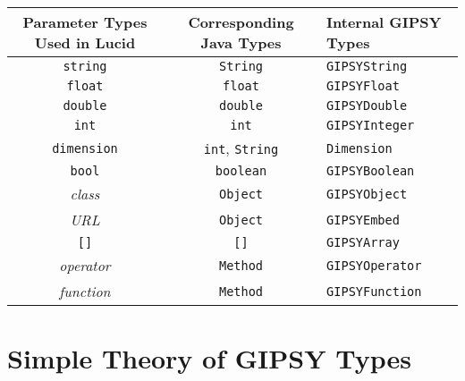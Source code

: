 \documentclass{easychair}
\newcommand{\api}[1]{\texttt{#1}\index{API!#1}}
\begin{document}
\begin{table}
\begin{minipage}[b]{\textwidth}
\begin{center}
\begin{tabular}{|c|c|l|}
{\scriptsize Parameter Types Used in Lucid} & {\scriptsize Corresponding Java Types}   & {\scriptsize Internal GIPSY Types} \\ \hline\hline
\api{string}                                & \api{String}                             & \api{GIPSYString}\\
\api{float}                                 & \api{float}                              & \api{GIPSYFloat}\\
\api{double}                                & \api{double}                             & \api{GIPSYDouble}\\
\api{int}                                   & \api{int}                                & \api{GIPSYInteger} \\
\api{dimension}                             & \api{int}, \api{String}                  & \api{Dimension} \\
\api{bool}                                  & \api{boolean}                            & \api{GIPSYBoolean}\\
{\it class}                                 & \api{Object}                             & \api{GIPSYObject}\\
{\it URL}                                   & \api{Object}                             & \api{GIPSYEmbed}\\
\api{[]}                                    & \api{[]}                                 & \api{GIPSYArray}\\
{\it operator}                              & \api{Method}                             & \api{GIPSYOperator}\\
{\it function}                              & \api{Method}                             & \api{GIPSYFunction}\\ \hline
\end{tabular}
\end{center}
\end{minipage}
\end{table}


\section{Simple Theory of GIPSY Types}
\label{sect:stgt}
\end{document}
